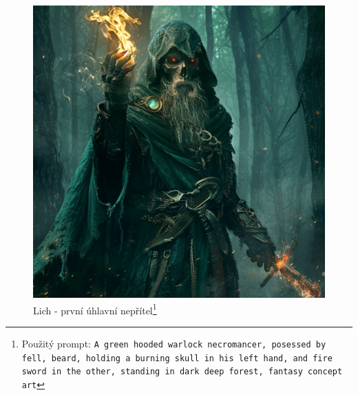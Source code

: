\begin{figure}[h]
  \begin{minipage}{\textwidth}
    \centering
    \includegraphics[width=\textwidth]{resources/figures/undeadSkeletNecro.png}
    \caption[Lich - první úhlavní nepřítel]{Lich - první úhlavní nepřítel\footnote[4]{Použitý prompt: \texttt{A green hooded warlock necromancer, posessed by fell, beard, holding a burning skull in his left hand, and fire sword in the other, standing in dark deep forest, fantasy concept art}}}
    \label{fig:undeadSkeletNecro}
  \end{minipage}
\end{figure}

